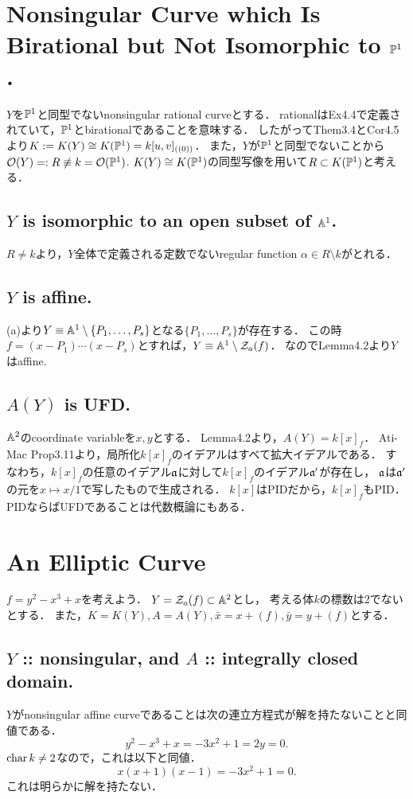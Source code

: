 \documentclass[a4paper]{jsarticle}
\newcommand{\regs}{\mathcal{O}}
\begin{document}
\section{Nonsingular Curve which Is Birational but Not Isomorphic to $\mathbb{P}^1$.} %
    $Y$を$\mathbb{P}^1$と同型でないnonsingular rational curveとする．
    rationalはEx4.4で定義されていて，$\mathbb{P}^1$とbirationalであることを意味する．
    したがってThem3.4とCor4.5より$K:=K(Y) \cong K(\mathbb{P}^1)=k[u,v]_{((0))}$．
    また，$Y$が$\mathbb{P}^1$と同型でないことから$\regs(Y)=:R \not \iso k = \regs(\proj^1)$.
    $K(Y) \cong K(\mathbb{P}^1)$の同型写像を用いて$R \subset K(\mathbb{P}^1)$と考える．

    \subsection{$Y$ is isomorphic to an open subset of $\mathbb{A}^1$.}
    $R \neq k$より，$Y$全体で定義される定数でないregular function $\alpha \in R \setminus k$がとれる．
    

    \subsection{$Y$ is affine.}
    (a)より$Y \equiv \mathbb{A}^1 \setminus \{P_1,\dots,P_s\}$となる$\{P_1,\dots,P_s\}$が存在する．
    この時$f=(x-P_1)\cdots(x-P_s)$とすれば，$Y \equiv \mathbb{A}^1 \setminus \mathcal{Z}_a(f)$．
    なのでLemma4.2より$Y$はaffine.

    \subsection{$A(Y)$ is UFD.}
    $\mathbb{A}^2$のcoordinate variableを$x,y$とする．
    Lemma4.2より，$A(Y)=k[x]_f$．
    Ati-Mac Prop3.11より，局所化$k[x]_f$のイデアルはすべて拡大イデアルである．
    すなわち，$k[x]_f$の任意のイデアル$\mathfrak{a}$に対して$k[x]_f$のイデアル$\mathfrak{a}'$が存在し，
    $\mathfrak{a}$は$\mathfrak{a}'$の元を$x \mapsto x/1$で写したもので生成される．
    $k[x]$はPIDだから，$k[x]_f$もPID．
    PIDならばUFDであることは代数概論にもある．

\section{An Elliptic Curve} %
    $f=y^2-x^3+x$を考えよう．
    $Y=\mathcal{Z}_a(f) \subset \mathbb{A}^2$とし，
    考える体$k$の標数は2でないとする．
    また，$K=K(Y), A=A(Y), \bar{x}=x+(f), \bar{y}=y+(f)$とする．

    \subsection{$Y$ :: nonsingular, and $A$ :: integrally closed domain.}
    $Y$がnonsingular affine curveであることは次の連立方程式が解を持たないことと同値である．
    \[ y^2-x^3+x=-3x^2+1=2y=0. \]
    $\operatorname{char} k \neq 2$なので，これは以下と同値．
    \[ x(x+1)(x-1)=-3x^2+1=0. \]
    これは明らかに解を持たない．
\end{document}
